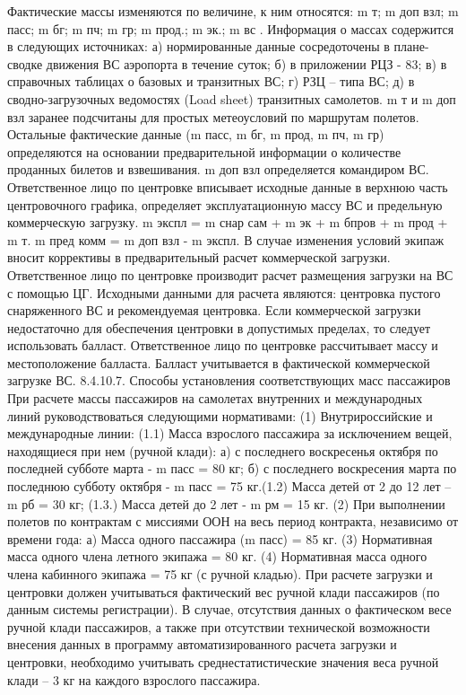 Фактические массы изменяются по величине, к ним относятся: m т; m доп взл; m пасс; m бг; m пч; m гр; m прод.; m эк.; m вс . Информация о массах содержится в следующих источниках:
а)	нормированные данные сосредоточены в плане-сводке движения ВС аэропорта в течение суток; 
б)	в приложении РЦЗ - 83;
в)	в справочных таблицах о базовых и транзитных ВС;
г)	РЗЦ – типа ВС;
д)	в сводно-загрузочных ведомостях (Load sheet) транзитных самолетов.
m т и m доп взл заранее подсчитаны для простых метеоусловий по маршрутам полетов. 
Остальные фактические данные (m пасс, m бг, m прод, m пч, m гр) определяются на основании предварительной информации о количестве проданных билетов и взвешивания.
m доп взл определяется командиром ВС.
Ответственное лицо по центровке вписывает исходные данные в верхнюю часть центровочного графика, определяет эксплуатационную массу ВС и предельную коммерческую загрузку.
m экспл = m снар сам + m эк + m бпров + m прод + m т.
m пред комм = m доп взл - m экспл.
В случае изменения условий экипаж вносит коррективы в предварительный расчет коммерческой загрузки.
Ответственное лицо по центровке производит расчет размещения загрузки на ВС с помощью ЦГ. Исходными данными для расчета являются: центровка пустого снаряженного ВС и рекомендуемая центровка.
Если коммерческой загрузки недостаточно для обеспечения центровки в допустимых пределах, то следует использовать балласт. Ответственное лицо по центровке рассчитывает массу и местоположение балласта. Балласт учитывается в фактической коммерческой загрузке ВС.
8.4.10.7. Способы установления соответствующих масс пассажиров
При расчете массы пассажиров на самолетах внутренних и международных линий руководствоваться следующими нормативами:
(1) Внутрироссийские и международные линии:
(1.1) Масса взрослого пассажира за исключением вещей, находящиеся при нем (ручной клади):
а) с последнего воскресенья октября по последней субботе марта - m пасс = 80 кг;
б) с последнего воскресения марта по последнюю субботу октября - m пасс = 75 кг.(1.2) Масса детей от 2 до 12 лет – m рб = 30 кг;
(1.3.) Масса детей до 2 лет - m рм = 15 кг.
(2) При выполнении полетов по контрактам с миссиями ООН на весь период контракта, независимо от времени года:
а) Масса одного пассажира (m пасс) = 85 кг.	
(3) Нормативная масса одного члена летного экипажа = 80 кг. 
(4) Нормативная масса одного члена кабинного экипажа = 75 кг (с ручной кладью). 
При расчете загрузки и центровки должен учитываться фактический вес ручной клади пассажиров (по данным системы регистрации).
В случае, отсутствия данных о фактическом весе ручной клади пассажиров, а также при отсутствии технической возможности внесения данных в программу автоматизированного расчета загрузки и центровки, необходимо учитывать среднестатистические значения веса ручной клади – 3 кг на каждого взрослого пассажира. 
